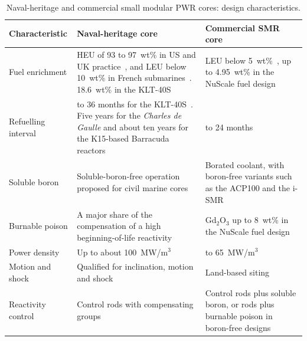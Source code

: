 \begin{table}[htbp]
  \centering
  \footnotesize
  \caption{Naval-heritage and commercial small modular PWR cores: design characteristics.}
  \label{tab:naval-vs-commercial}
  \begin{tabularx}{\textwidth}{@{}>{\raggedright\arraybackslash}p{2.8cm} >{\raggedright\arraybackslash}X >{\raggedright\arraybackslash}X@{}}
    \toprule
    \textbf{Characteristic} & \textbf{Naval-heritage core} &
    \textbf{Commercial SMR core} \\
    \midrule
    Fuel enrichment &
    HEU of 93 to 97~wt\% in US and UK practice~\cite{jason_2016}, and LEU
    below 10~wt\% in French submarines~\cite{ippolito_1990}. 18.6~wt\% in
    the KLT-40S~\cite{worldnuclearreport_smr} &
    LEU below 5~wt\%~\cite{iaea_smr_2024}, up to 4.95~wt\% in the NuScale
    fuel design~\cite{nuscale_htp2_2017} \\
    \addlinespace
    Refuelling interval &
    30 to 36 months for the KLT-40S~\cite{worldnuclearreport_smr}. Five
    years for the \emph{Charles de Gaulle} and about ten years for the
    K15-based Barracuda reactors~\cite{wna_ships} &
    18 to 24 months~\cite{iaea_smr_2024} \\
    \addlinespace
    Soluble boron &
    Soluble-boron-free operation proposed for civil marine
    cores~\cite{alam_partI_2019} &
    Borated coolant, with boron-free variants such as the ACP100 and the
    i-SMR~\cite{acp100_physor2020,ismr_sbf_2024} \\
    \addlinespace
    Burnable poison &
    A major share of the compensation of a high beginning-of-life
    reactivity~\cite{alam_partI_2019,ippolito_1990} &
    Gd$_2$O$_3$ up to 8~wt\% in the NuScale fuel
    design~\cite{nuscale_htp2_2017} \\
    \addlinespace
    Power density &
    Up to about 100~MW/m$^3$~\cite{alam_2019_hotchannel} &
    60 to 65~MW/m$^3$~\cite{alam_2019_hotchannel} \\
    \addlinespace
    Motion and shock &
    Qualified for inclination, motion and shock~\cite{ritm200n_nei_2024} &
    Land-based siting~\cite{iaea_smr_2024} \\
    \addlinespace
    Reactivity control &
    Control rods with compensating groups~\cite{worldnuclearreport_smr} &
    Control rods plus soluble boron, or rods plus burnable poison in
    boron-free designs~\cite{acp100_physor2020,ismr_sbf_2024} \\
    \bottomrule
  \end{tabularx}
\end{table}

